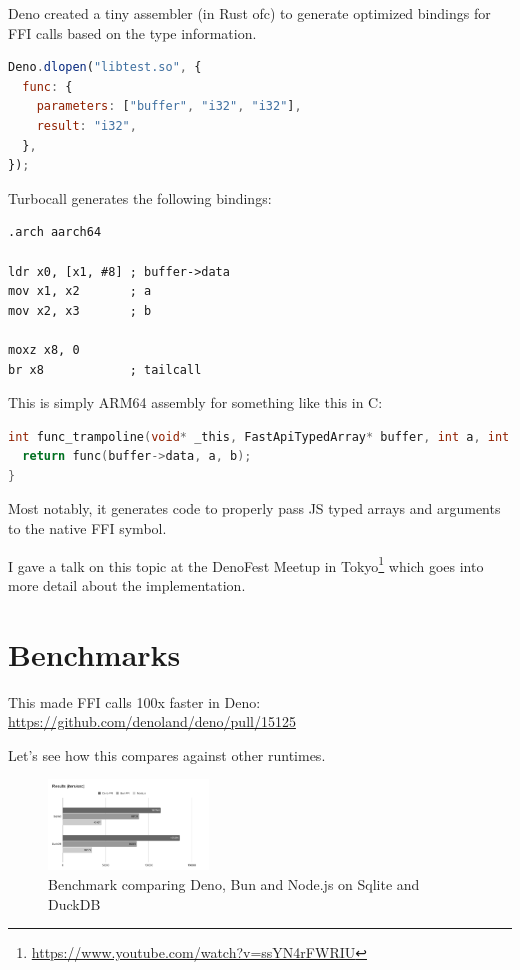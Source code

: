 \documentclass{article}
\begin{document}
Deno created a tiny assembler (in Rust ofc) to generate optimized bindings for FFI calls based on the type information.

\begin{lstlisting}[language=JavaScript, caption=example Deno.dlopen]
Deno.dlopen("libtest.so", {
  func: {
    parameters: ["buffer", "i32", "i32"],
    result: "i32",
  },
});
\end{lstlisting}

Turbocall generates the following bindings:

\begin{lstlisting}[language=Assembly, caption=example Turbocall assembly]
.arch aarch64

ldr x0, [x1, #8] ; buffer->data
mov x1, x2       ; a
mov x2, x3       ; b

moxz x8, 0
br x8            ; tailcall
\end{lstlisting}

This is simply ARM64 assembly for something like this in C:
\begin{lstlisting}[language=C, caption=generated function trampoline]
int func_trampoline(void* _this, FastApiTypedArray* buffer, int a, int b) {
  return func(buffer->data, a, b);
}
\end{lstlisting}

Most notably, it generates code to properly pass JS typed arrays and arguments to the native FFI symbol.

I gave a talk on this topic at the DenoFest Meetup in Tokyo\footnote{\url{https://www.youtube.com/watch?v=ssYN4rFWRIU}}
which goes into more detail about the implementation.

\section{Benchmarks}

This made FFI calls 100x faster in Deno: \url{https://github.com/denoland/deno/pull/15125}

Let's see how this compares against other runtimes.

\begin{figure}
\begin{center}
\includegraphics[width=0.38\textwidth]{assets/deno.png}
\end{center}
\caption{Benchmark comparing Deno, Bun and Node.js on Sqlite and DuckDB}
\end{figure}
\end{document}
